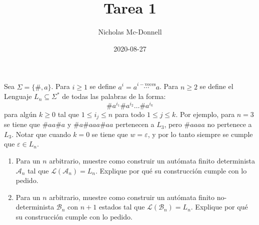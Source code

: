 \documentclass{homework}
\title{Tarea 1}
\date{2020-08-27}
\author{Nicholas Mc-Donnell}
\begin{document}
\maketitle
\newpage
{}
\begin{p1}
    
    \begin{prob}
        Sea \(\Sigma=\{\#,a\}\). Para \(i\geq1\) se define \(a^i=a\stackrel{i-\text{veces}}{\cdots}a\). Para \(n\geq2\) se define el Lenguaje \(L_n\subseteq\Sigma^*\) de todas las palabras de la forma:
        \[\#a^{i_1}\#a^{i_2}\dots\#a^{i_k}\]
        para algún \(k\geq0\) tal que \(1\leq i_j\leq n\) para todo \(1\leq j\leq k\). Por ejemplo, para \(n=3\) se tiene que \(\#aa\#a\) y \(\#a\#aaa\#aa\) pertenecen a \(L_3\), pero \(\#aaaa\) no pertenece a \(L_3\). Notar que cuando \(k=0\) se tiene que \(w=\varepsilon\), y por lo tanto siempre se cumple que \(\varepsilon\in L_n\).
        \begin{enumerate}
            \item Para un \(n\) arbitrario, muestre como construir un autómata finito determinista \(\mathcal{A}_n\) tal que \(\mathcal{L}(\mathcal{A}_n)=L_n\). Explique por qué su construcción cumple con lo pedido.
            \item Para un \(n\) arbitrario, muestre como construir un autómata finito no-determinista \(\mathcal{B}_n\) con \(n+1\) estados tal que \(\mathcal{L}(\mathcal{B}_n)=L_n\). Explique por qué su construcción cumple con lo pedido.
        \end{enumerate}\
    \end{prob}
    

\end{p1}
\end{document}

